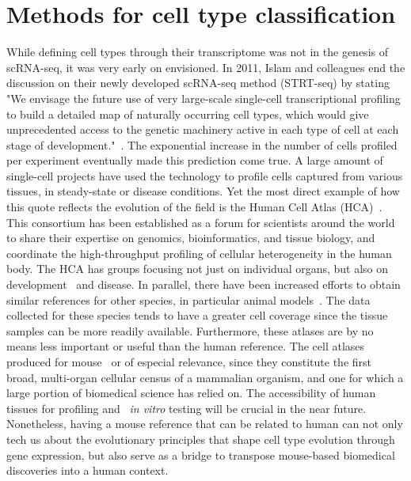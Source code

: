 \section{Methods for cell type classification}  %
\label{section1.3}

While defining cell types through their transcriptome was not in the genesis of scRNA-seq, it was very early on envisioned. In 2011, Islam and colleagues end the discussion on their newly developed scRNA-seq method (STRT-seq) by stating "We envisage the future use of very large-scale single-cell transcriptional profiling to build a detailed map of naturally occurring cell types, which would give unprecedented access to the genetic machinery active in each type of cell at each stage of development."~\citep{islam_characterization_2011}. The exponential increase in the number of cells profiled per experiment eventually made this prediction come true. A large amount of single-cell projects have used the technology to profile cells captured from various tissues, in steady-state or disease conditions. Yet the most direct example of how this quote reflects the evolution of the field is the Human Cell Atlas (HCA)~\citep{regev_human_2017}. This consortium has been established as a forum for scientists around the world to share their expertise on genomics, bioinformatics, and tissue biology, and coordinate the high-throughput profiling of cellular heterogeneity in the human body. The HCA has groups focusing not just on individual organs, but also on development~\citep{behjati_mapping_2018,taylor_pediatric_2019} and disease. In parallel, there have been increased efforts to obtain similar references for other species, in particular animal models~\citep{fincher_cell_2018,cao_comprehensive_2017}. The data collected for these species tends to have a greater cell coverage since the tissue samples can be more readily available. Furthermore, these atlases are by no means less important or useful than the human reference. The cell atlases produced for mouse~\citep{han_mapping_2018,noauthor_single-cell_2018} or of especial relevance, since they constitute the first broad, multi-organ cellular census of a mammalian organism, and one for which a large portion of biomedical science has relied on. The accessibility of human tissues for profiling and ~\textit{in vitro} testing will be crucial in the near future. Nonetheless, having a mouse reference that can be related to human can not only tech us about the evolutionary principles that shape cell type evolution through gene expression, but also serve as a bridge to transpose mouse-based biomedical discoveries into a human context.

